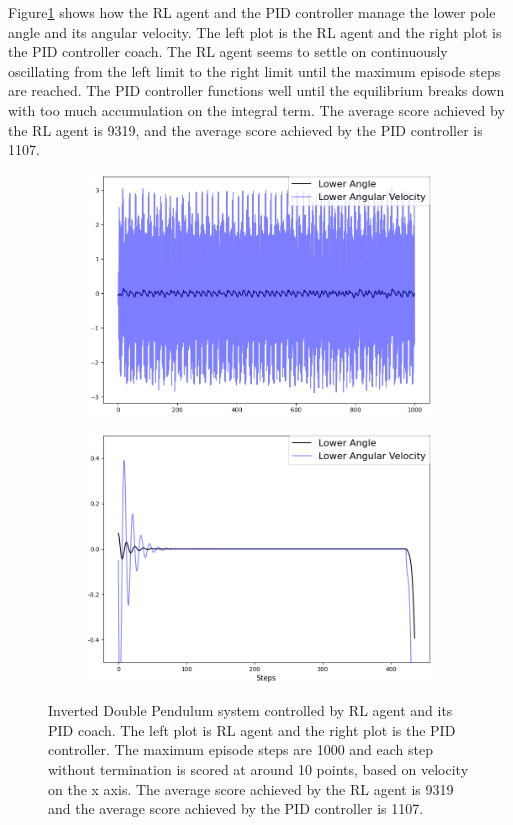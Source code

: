 \documentclass[journal]{IEEEtran}
\begin{document}
Figure\ref{fig:double} shows how the RL agent and the PID controller manage the lower pole angle and its angular velocity. The left plot is the RL agent and the right plot is the PID controller coach. The RL agent seems to settle on continuously oscillating from the left limit to the right limit until the maximum episode steps are reached. The PID controller functions well until the equilibrium breaks down with too much accumulation on the integral term. The average score achieved by the RL agent is 9319, and the average score achieved by the PID controller is 1107.
\begin{figure}
\centering
\begin{subfigure}{0.24\textwidth}
  \centering
  \includegraphics[width=\linewidth]{double_RL.png}
\end{subfigure}%
\hfill
\begin{subfigure}{.24\textwidth}
  \centering
  \includegraphics[width=\linewidth]{double_PID.png}
\end{subfigure}
\caption{Inverted Double Pendulum system controlled by RL agent and its PID coach. The left plot is RL agent and the right plot is the PID controller. The maximum episode steps are 1000 and each step without termination is scored at around 10 points, based on velocity on the x axis. The average score achieved by the RL agent is 9319 and the average score achieved by the PID controller is 1107. }
\label{fig:double}
\end{figure}
\end{document}
